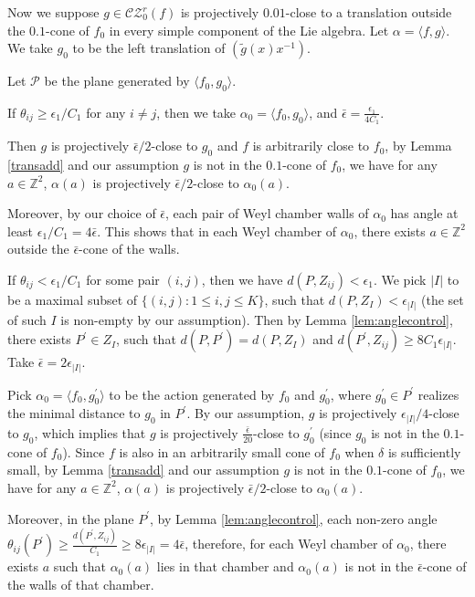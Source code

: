 \documentclass[11pt]{amsart}
\numberwithin{equation}{section}
\newcommand{\Z}{\mathbb{Z}}
\newcommand{\CZ}{\mathcal{CZ}}
\theoremstyle{plain}
\begin{document}
Now we suppose $g\in \CZ^r_0(f)$ is projectively $0.01$-close to a translation outside the $0.1$-cone of $f_0$ in every simple component of the Lie algebra. Let $\alpha=\langle f,g\rangle$. We take $g_0$ to be the left translation of $(\tilde g(x)x^{-1})$. 

Let $\mathcal P$ be the plane generated by $\langle f_0,g_0\rangle$. 

If $\theta_{ij}\ge \epsilon_1/C_1$ for any $i\neq j$, then we take $\alpha_0=\langle f_0,g_0\rangle$, and $\bar{\epsilon}=\frac{\epsilon_1}{4C_1}$. 

Then $g$ is projectively $ \bar\epsilon/2$-close to $g_0$ and $f$ is arbitrarily close to $f_0$, by Lemma \ref{transadd} and our assumption $g$ is not in the $0.1$-cone of $f_0$, we have for any $a\in \Z^2$, $\alpha(a)$ is projectively $\bar\epsilon/2$-close to $\alpha_0(a)$.

Moreover, by our choice of $\bar{\epsilon}$, each pair of Weyl chamber walls of $\alpha_0$ has angle at least $ \epsilon_1/C_1=4\bar \epsilon$. This shows that in each Weyl chamber of $\alpha_0$, there exists $a\in \Z^2$ outside the $\bar\epsilon$-cone of the walls. 

If $\theta_{ij}< \epsilon_1/C_1$ for some pair $(i,j)$, then we have $d(P,Z_{ij})< \epsilon_1$. We pick $|I|$ to be a maximal subset of $\{(i,j):1\le i,j\le K\}$, such that $d(P,Z_I)< \epsilon_{|I|}$ (the set of such $I$ is non-empty by our assumption). Then by Lemma \ref{lem:anglecontrol}, there exists $P^\prime \in Z_{I}$, such that $d(P,P^\prime)=d(P,Z_{I})$ and $d(P^\prime, Z_{ij})\ge 8C_1\epsilon_{|I|}$. Take $\bar \epsilon=2\epsilon_{|I|}$. 

Pick $\alpha_0=\langle f_0,g_0^\prime\rangle$ to be the action generated by $f_0$ and $g_0^\prime$, where $g_0^\prime\in P^\prime$ realizes the minimal distance to $g_0$ in $P^\prime$. By our assumption, $g$ is projectively $ \epsilon_{|I|}/4$-close to $g_0$, which implies that $g$ is projectively $ \frac{\bar\epsilon}{20}$-close to $g_0^\prime$ (since $g_0$ is not in the $0.1$-cone of $f_0$). Since $f$ is also in an arbitrarily small cone of $f_0$ when $\delta$ is sufficiently small, by Lemma \ref{transadd} and our assumption $g$ is not in the $0.1$-cone of $f_0$, we have for any $a\in \Z^2$, $\alpha(a)$ is projectively $\bar\epsilon/2$-close to $\alpha_0(a)$. 

Moreover, in the plane $P^\prime$, by Lemma \ref{lem:anglecontrol}, each non-zero angle $\theta_{ij}(P^\prime)\ge\frac{d(P^\prime,Z_{ij})}{C_1}\ge 8\epsilon_{|I|}=4\bar\epsilon$, therefore, for each Weyl chamber of $\alpha_0$, there exists $a$ such that $\alpha_0(a)$ lies in that chamber and $\alpha_0(a)$ is not in the $\bar\epsilon$-cone of the walls of that chamber.
\end{document}
